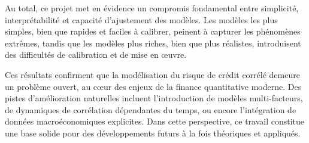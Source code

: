 Au total, ce projet met en évidence un compromis fondamental entre simplicité, interprétabilité et capacité d’ajustement des modèles. Les modèles les plus simples, bien que rapides et faciles à calibrer, peinent à capturer les phénomènes extrêmes, tandis que les modèles plus riches, bien que plus réalistes, introduisent des difficultés de calibration et de mise en œuvre.

Ces résultats confirment que la modélisation du risque de crédit corrélé demeure un problème ouvert, au cœur des enjeux de la finance quantitative moderne. Des pistes d’amélioration naturelles incluent l’introduction de modèles multi-facteurs, de dynamiques de corrélation dépendantes du temps, ou encore l’intégration de données macroéconomiques explicites. Dans cette perspective, ce travail constitue une base solide pour des développements futurs à la fois théoriques et appliqués.